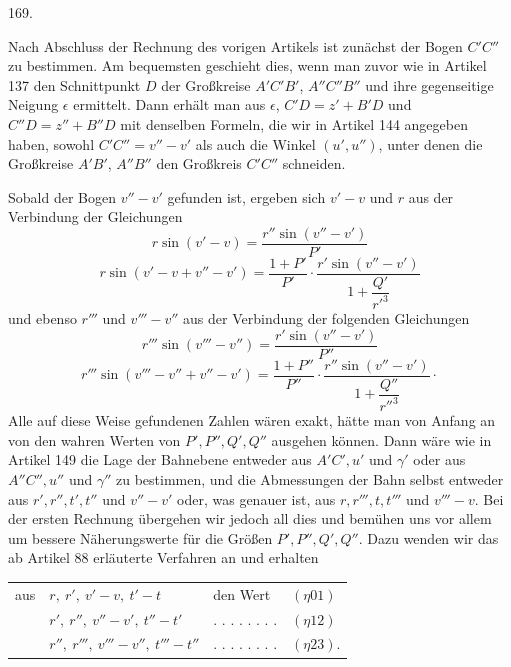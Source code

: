 \par{}\medskip
\begin{center}\hypertarget{native-234-article169}{}169.\end{center}
Nach Abschluss der Rechnung des vorigen Artikels ist zunächst der Bogen $C'C''$ zu bestimmen. Am bequemsten geschieht dies, wenn man zuvor wie in Artikel 137 den Schnittpunkt $D$ der Großkreise $A'C'B'$, $A''C''B''$ und ihre gegenseitige Neigung $\epsilon$ ermittelt. Dann erhält man aus $\epsilon$, $C'D=z'+B'D$ und $C''D=z''+B''D$ mit denselben Formeln, die wir in Artikel 144 angegeben haben, sowohl $C'C''=v''-v'$ als auch die Winkel $(u',u'')$, unter denen die Großkreise $A'B'$, $A''B''$ den Großkreis $C'C''$ schneiden.

Sobald der Bogen $v''-v'$ gefunden ist, ergeben sich $v'-v$ und $r$ aus der Verbindung der Gleichungen
\[
r\sin(v'-v)=\frac{r''\sin(v''-v')}{P'}
\]
\[
r\sin(v'-v+v''-v')=\frac{1+P'}{P'}\cdot\frac{r'\sin(v''-v')}{1+\dfrac{Q'}{r'^3}}
\]
und ebenso $r'''$ und $v'''-v''$ aus der Verbindung der folgenden Gleichungen
\[
r'''\sin(v'''-v'')=\frac{r'\sin(v''-v')}{P''}
\]
\[
r'''\sin(v'''-v''+v''-v')=\frac{1+P''}{P''}\cdot\frac{r''\sin(v''-v')}{1+\dfrac{Q''}{r''^3}}\mathpunct{\cdot}
\]
Alle auf diese Weise gefundenen Zahlen wären exakt, hätte man von Anfang an von den wahren Werten von $P',P'',Q',Q''$ ausgehen können. Dann wäre wie in Artikel 149 die Lage der Bahnebene entweder aus $A'C',u'$ und $\gamma'$ oder aus $A''C'',u''$ und $\gamma''$ zu bestimmen, und die Abmessungen der Bahn selbst entweder aus $r',r'',t',t''$ und $v''-v'$ oder, was genauer ist, aus $r,r''',t,t'''$ und $v'''-v$. Bei der ersten Rechnung übergehen wir jedoch all dies und bemühen uns vor allem um bessere Näherungswerte für die Größen $P',P'',Q',Q''$. Dazu wenden wir das ab Artikel 88 erläuterte Verfahren an und erhalten
\begin{center}
\begin{tabular}{@{}llll@{}}
aus & $r,\ r',\ v'-v,\ t'-t$ & den Wert & $(\eta01)$\\
& $r',\ r'',\ v''-v',\ t''-t'$ & . . . . . . . . & $(\eta12)$\\
& $r'',\ r''',\ v'''-v'',\ t'''-t''$ & . . . . . . . . & $(\eta23)$.
\end{tabular}
\end{center}

